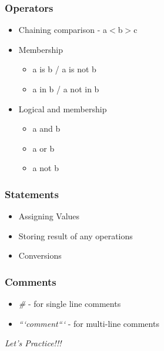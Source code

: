 \documentclass[14pt]{beamer}
\begin{document}
    \begin{frame}
        \frametitle{Operators}
        \begin{itemize}
            \item Chaining comparison - a$<$b$>$c
            \item Membership
                \begin{itemize}
                    \item a is b / a is not b
                    \item a in b / a not in b
                \end{itemize}
            \item Logical and membership
                \begin{itemize}
                    \item a and b
                    \item a or b
                    \item a not b
                \end{itemize}
        \end{itemize}
    \end{frame}
    \begin{frame}
        \frametitle{Statements}
        \begin{itemize}
            \item Assigning Values
            \item Storing result of any operations
            \item Conversions
        \end{itemize}
    \end{frame}
    \begin{frame}
        \frametitle{Comments}
        \begin{itemize}
            \item \emph{\#} - for single line comments
            \item \emph{```comment```} - for multi-line comments
        \end{itemize}
    \end{frame}
    \begin{frame}
        \begin{center}
            \emph{Let's Practice!!!}
        \end{center}
    \end{frame}
\end{document}
